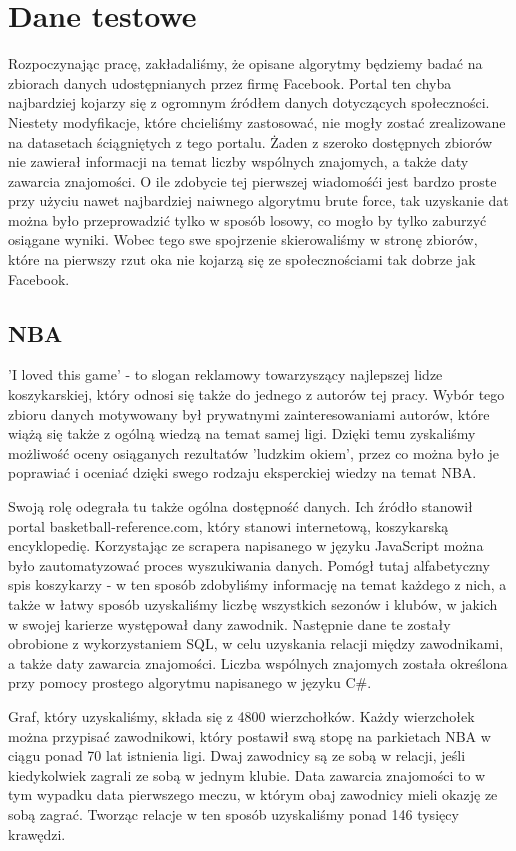 \documentclass{article}
\begin{document}
\section{Dane testowe}
Rozpoczynając pracę, zakładaliśmy, że opisane algorytmy będziemy badać na zbiorach danych udostępnianych przez firmę Facebook. Portal ten chyba najbardziej kojarzy się z ogromnym źródłem danych dotyczących społeczności. Niestety modyfikacje, które chcieliśmy zastosować, nie mogły zostać zrealizowane na datasetach ściągniętych z tego portalu. Żaden z szeroko dostępnych zbiorów nie zawierał informacji na temat liczby wspólnych znajomych, a także daty zawarcia znajomości. O ile zdobycie tej pierwszej wiadomośći jest bardzo proste przy użyciu nawet najbardziej naiwnego algorytmu brute force, tak uzyskanie dat można było przeprowadzić tylko w sposób losowy, co mogło by tylko zaburzyć osiągane wyniki. Wobec tego swe spojrzenie skierowaliśmy w stronę zbiorów, które na pierwszy rzut oka nie kojarzą się ze społecznościami tak dobrze jak Facebook.
\subsection{NBA}
'I loved this game' - to slogan reklamowy towarzyszący najlepszej lidze koszykarskiej, który odnosi się także do jednego z autorów tej pracy. Wybór tego zbioru danych motywowany był prywatnymi zainteresowaniami autorów, które wiążą się także z ogólną wiedzą na temat samej ligi. Dzięki temu zyskaliśmy możliwość oceny osiąganych rezultatów 'ludzkim okiem', przez co można było je poprawiać i oceniać dzięki swego rodzaju eksperckiej wiedzy na temat NBA.

Swoją rolę odegrała tu także ogólna dostępność danych. Ich źródło stanowił portal basketball-reference.com, który stanowi internetową, koszykarską encyklopedię. Korzystając ze scrapera napisanego w języku JavaScript można było zautomatyzować proces wyszukiwania danych. Pomógł tutaj alfabetyczny spis koszykarzy - w ten sposób zdobyliśmy informację na temat każdego z nich, a także w łatwy sposób uzyskaliśmy liczbę wszystkich sezonów i klubów, w jakich w swojej karierze występował dany zawodnik. Następnie dane te zostały obrobione z wykorzystaniem SQL, w celu uzyskania relacji między zawodnikami, a także daty zawarcia znajomości. Liczba wspólnych znajomych została określona przy pomocy prostego algorytmu napisanego w języku C\#.

Graf, który uzyskaliśmy, składa się z 4800 wierzchołków. Każdy wierzchołek można przypisać zawodnikowi, który postawił swą stopę na parkietach NBA w ciągu ponad 70 lat istnienia ligi. Dwaj zawodnicy są ze sobą w relacji, jeśli kiedykolwiek zagrali ze sobą w jednym klubie. Data zawarcia znajomości to w tym wypadku data pierwszego meczu, w którym obaj zawodnicy mieli okazję ze sobą zagrać. Tworząc relacje w ten sposób uzyskaliśmy ponad 146 tysięcy krawędzi.
\end{document}
